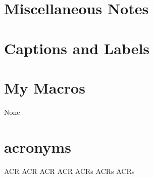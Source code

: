 \section{Miscellaneous Notes}

\section{Captions and Labels}



\section{My Macros}
None

\section{acronyms}
\ac{ACR}   %
\acl{ACR}  %
\acf{ACR}  %
\acs{ACR}  %
\acp{ACR}  %
\acfp{ACR} %
\aclp{ACR} %

